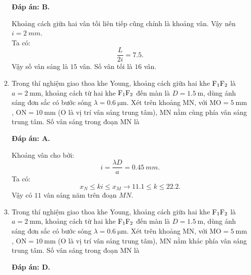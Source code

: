 \begin{enumerate}[label=\bfseries Câu \arabic*:]
	\loigiai
	{		\textbf{Đáp án: B.}
		
Khoảng cách giữa hai vân tối liên tiếp cũng chính là khoảng vân. Vậy nên $ i = \SI{2}{mm} $. \\
Ta có:
$$
	\dfrac{L}{2i} = \num{7,5}.
$$
Vậy số vân sáng là $ 15 $ vân. Số vân tối là $ 16 $ vân.
	}
	
	\item {}
	
	\cauhoi
	{Trong thí nghiệm giao thoa khe Young, khoảng cách giữa hai khe $\text F _1 \text F_2$ là $a=\SI{2}{\milli \meter}$, khoảng cách từ hai khe $\text F_1 \text F_2$ đến màn là $D=\SI{1.5}{\meter}$, dùng ánh sáng đơn sắc có bước sóng $\lambda=\SI{0.6}{\micro \meter}$. Xét trên khoảng MN, với $\text{MO}=\SI{5}{\milli \meter}$, $\text{ON}=\SI{10}{\milli \meter}$ (O là vị trí vân sáng trung tâm), MN nằm cùng phía vân sáng trung tâm. Số vân sáng trong đoạn MN là
	}
	
	\loigiai
	{		\textbf{Đáp án: A.}
		
Khoảng vân cho bởi:
$$
	i = \dfrac{\lambda D}{a} = \SI{0,45}{mm}.
$$
Ta có:
$$
	x_{N} \leq ki \leq x_{M} \rightarrow \num{11,1} \leq k \leq \num{22,2}.
$$
Vậy có $ 11 $ vân sáng năm trên đoạn $ MN $.
	}
	
	\item {}
	
	\cauhoi
	{Trong thí nghiệm giao thoa khe Young, khoảng cách giữa hai khe $\text F _1 \text F_2$ là $a=\SI{2}{\milli \meter}$, khoảng cách từ hai khe $\text F_1 \text F_2$ đến màn là $D=\SI{1.5}{\meter}$, dùng ánh sáng đơn sắc có bước sóng $\lambda=\SI{0.6}{\micro \meter}$. Xét trên khoảng MN, với $\text{MO}=\SI{5}{\milli \meter}$, $\text{ON}=\SI{10}{\milli \meter}$ (O là vị trí vân sáng trung tâm), MN nằm khác phía vân sáng trung tâm. Số vân sáng trong đoạn MN là
	}
	
	\loigiai
	{		\textbf{Đáp án: D.}
		
}
\end{enumerate}
